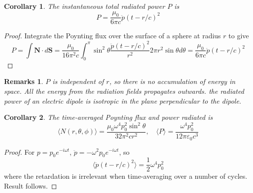 \documentclass[a4paper]{article}
\newtheorem{remarks}{Remarks}[section]
\theoremstyle{new}
\newtheorem{cor}{Corollary}[section]
\begin{document}
\begin{cor}
The instantaneous total radiated power $P$ is
$$P=\frac{\mu_0}{6\pi c}\ddot{p}(t-r/c)^2$$
\end{cor}
\begin{proof}
Integrate the Poynting flux over the surface of a sphere at radius $r$ to give
$$P=\int\mathbf{N}\cdot d\mathbf{S}=\frac{\mu_0}{16\pi^2c}\int_0^\pi\sin^2\theta\frac{\ddot{p}(t-r/c)^2}{r^2}2\pi r^2\sin\theta d\theta=\frac{\mu_0}{6\pi c}\ddot{p}(t-r/c)^2$$
\end{proof}
\begin{remarks}
$P$ is independent of $r$, so there is no accumulation of energy in space. All the energy from the radiation fields propagates outwards. the radiated power of an electric dipole is isotropic in the plane perpendicular to the dipole.
\end{remarks}
\begin{cor}
The time-averaged Poynting flux and power radiated is
$$\langle N(r,\theta,\phi)\rangle=\frac{\mu_0\omega^4p_0^2\sin^2\theta}{32\pi^2cr^2},\quad\langle P\rangle=\frac{\omega^4p_0^2}{12\pi\varepsilon_0c^3}$$
\end{cor}
\begin{proof}
For $p=p_0e^{-i\omega t}$, $\ddot{p}=-\omega^2p_0e^{-i\omega t}$, so
$$\langle\ddot{p}(t-r/c)^2\rangle=\frac{1}{2}\omega^4p_0^2$$
where the retardation is irrelevant when time-averaging over a number of cycles. Result follows.
\end{proof}
\end{document}

